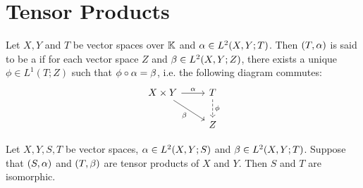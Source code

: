 \documentclass{book}
\begin{document}
\newpage
\section{Tensor Products}

\begin{defn}
	Let $X, Y$ and $T$ be vector spaces over $\mathbb{K}$ and $\alpha \in L^2(X, Y; T)$. Then $(T, \alpha)$ is said to be a  if for each vector space $Z$ and $\beta \in L^2(X, Y; Z)$, there exists a unique $\phi \in L^1(T;Z)$ such that $\phi \circ \alpha = \beta$, i.e. the following diagram commutes:
	\[ 
	\begin{tikzcd}
		X \times Y \arrow[r, "\al"] \arrow[dr, "\be"'] 	
		& T  \arrow[d, dashed, "\phi"] \\
		& Z 
	\end{tikzcd}
	\] 
\end{defn}

\begin{ex}
	Let $X, Y, S, T$ be vector spaces, $\alpha \in L^2(X, Y; S)$ and $\beta \in L^2(X, Y; T)$. Suppose that $(S, \alpha)$ and $(T, \beta)$ are tensor products of $X$ and $Y$. Then $S$ and $T$ are isomorphic. 
\end{ex}
\end{document}
